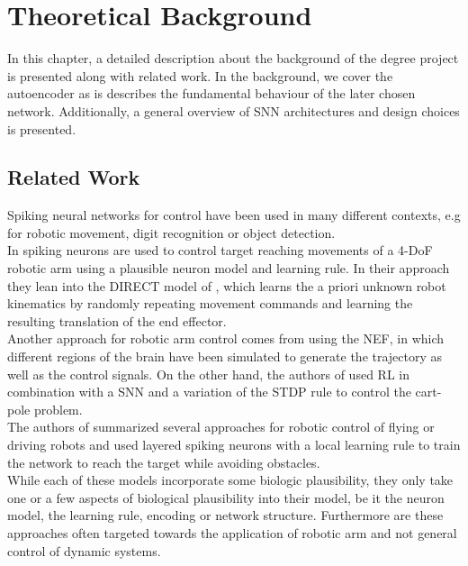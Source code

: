 \chapter{Theoretical Background}
In this chapter, a detailed description about the background of the degree project is presented along with related work. In the background, we cover the autoencoder as is describes the fundamental behaviour of the later chosen network. Additionally, a general overview of \ac{SNN} architectures and design choices is presented.\\

\section{Related Work}
Spiking neural networks for control have been used in many different contexts, e.g for robotic movement, digit recognition\cite{lee_training_2016} or object detection\cite{soures_deep_2019,zhou_deep_2020}.\\
In \cite{bouganis_training_2010} spiking neurons are used to control target reaching movements of a 4-DoF robotic arm using a plausible neuron model and learning rule. In their approach they lean into the DIRECT model of \cite{bullock_self-organizing_1993}, which learns the a priori unknown robot kinematics by randomly repeating movement commands and learning the resulting translation of the end effector.\\
Another approach for robotic arm control comes from \cite{dewolf_spiking_2016} using the \ac{NEF}\cite{eliasmith_neural_2004}, in which different regions of the brain have been simulated to generate the trajectory as well as the control signals. On the other hand, the authors of \cite{liu_spiking_2023} used \ac{RL} in combination with a \ac{SNN} and a variation of the \ac{STDP} rule to control the cart-pole problem.\\
The authors of \cite{bing_supervised_2019} summarized several approaches for robotic control of flying or driving robots and used layered spiking neurons with a local learning rule to train the network to reach the target while avoiding obstacles.\\
While each of these models incorporate some biologic plausibility, they only take one or a few aspects of biological plausibility into their model, be it the neuron model, the learning rule, encoding or network structure. Furthermore are these approaches often targeted towards the application of robotic arm and not general control of dynamic systems.\\

